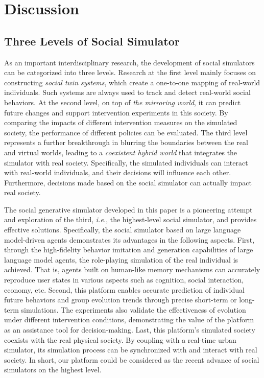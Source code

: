 \section{Discussion}





\subsection{Three Levels of Social Simulator}
As an important interdisciplinary research, the development of social simulators can be categorized into three levels. Research at the first level mainly focuses on constructing \textit{social twin systems}, which create a one-to-one mapping of real-world individuals. Such systems are always used to track and detect real-world social behaviors. At the second level, on top of \textit{the mirroring world}, it can predict future changes and support intervention experiments in this society. By comparing the impacts of different intervention measures on the simulated society, the performance of different policies can be evaluated. The third level represents a further breakthrough in blurring the boundaries between the real and virtual worlds, leading to a \textit{coexistent hybrid world} that integrates the simulator with real society. Specifically, the simulated individuals can interact with real-world individuals, and their decisions will influence each other. Furthermore, decisions made based on the social simulator can actually impact real society.

The social generative simulator developed in this paper is a pioneering attempt and exploration of the third, \textit{i.e.}, the highest-level social simulator, and provides effective solutions.
Specifically, the social simulator based on large language model-driven agents demonstrates its advantages in the following aspects. First, through the high-fidelity behavior imitation and generation capabilities of large language model agents, the role-playing simulation of the real individual is achieved. That is, agents built on human-like memory mechanisms can accurately reproduce user states in various aspects such as cognition, social interaction, economy, etc.
Second, this platform enables accurate prediction of individual future behaviors and group evolution trends through precise short-term or long-term simulations. The experiments also validate the effectiveness of evolution under different intervention conditions, demonstrating the value of the platform as an assistance tool for decision-making.
Last, this platform's simulated society coexists with the real physical society. By coupling with a real-time urban simulator, its simulation process can be synchronized with and interact with real society. 
In short, our platform could be considered as the recent advance of social simulators on the highest level.

